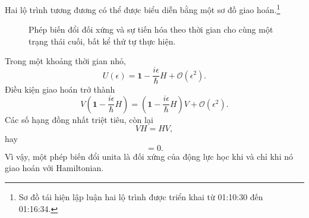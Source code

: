 Hai lộ trình tương đương có thể được biểu diễn bằng một sơ đồ giao hoán.\footnote{Sơ đồ tái hiện lập luận hai lộ trình được triển khai từ 01:10:30 đến 01:16:34.}
\begin{figure}
\centering
{}
\caption{Phép biến đổi đối xứng và sự tiến hóa theo thời gian cho cùng một trạng thái cuối, bất kể thứ tự thực hiện.}
\end{figure}

\begin{classroomqa}
\end{classroomqa}

\begin{classroomqa}
\end{classroomqa}

Trong một khoảng thời gian nhỏ,
\begin{equation}
U(\epsilon)
=
\mathbf 1-\frac{i\epsilon}{\hbar}H
+\mathcal O(\epsilon^2).
\end{equation}
Điều kiện giao hoán trở thành
\begin{equation}
V\left(
\mathbf 1-\frac{i\epsilon}{\hbar}H
\right)
=
\left(
\mathbf 1-\frac{i\epsilon}{\hbar}H
\right)V
+\mathcal O(\epsilon^2).
\end{equation}
Các số hạng đồng nhất triệt tiêu, còn lại
\begin{equation}
VH=HV,
\end{equation}
hay
\begin{equation}
[V,H]=0.
\end{equation}
Vì vậy, một phép biến đổi unita là đối xứng của động lực học khi và chỉ khi nó giao hoán với Hamiltonian.

